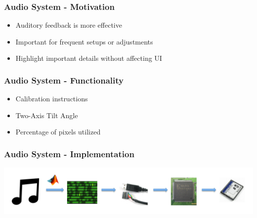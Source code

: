 \documentclass{beamer}
\begin{document}
\begin{frame}
\frametitle{Audio System - Motivation}
\begin{itemize}
	\item Auditory feedback is more effective
	\item Important for frequent setups or adjustments
	\item Highlight important details without affecting UI
\end{itemize}
\end{frame}

\begin{frame}
\frametitle{Audio System - Functionality}
\begin{itemize}
	\item Calibration instructions
	\item Two-Axis Tilt Angle
	\item Percentage of pixels utilized
\end{itemize}
\end{frame}

\begin{frame}
\frametitle{Audio System - Implementation}
\begin{itemize}
	\includegraphics[scale=0.24]{img/audioimpl}
\end{itemize}
\end{frame}
\end{document}
